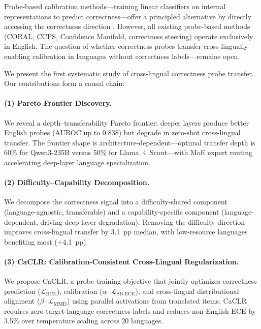\documentclass[11pt,a4paper]{article}
\begin{document}
Probe-based calibration methods---training linear classifiers on internal representations to predict correctness---offer a principled alternative by directly accessing the correctness direction \cite{}.
However, all existing probe-based methods (CORAL, CCPS, Confidence Manifold, correctness steering) operate exclusively in English.
The question of whether correctness probes transfer cross-lingually---enabling calibration in languages without correctness labels---remains open.

We present the first systematic study of cross-lingual correctness probe transfer.
Our contributions form a causal chain:

\paragraph{(1) Pareto Frontier Discovery.}
We reveal a depth--transferability Pareto frontier: deeper layers produce better English probes (AUROC up to 0.838) but degrade in zero-shot cross-lingual transfer.
The frontier shape is architecture-dependent---optimal transfer depth is 60\% for Qwen3-235B versus 50\% for Llama~4~Scout---with MoE expert routing accelerating deep-layer language specialization.

\paragraph{(2) Difficulty--Capability Decomposition.}
We decompose the correctness signal into a difficulty-shared component (language-agnostic, transferable) and a capability-specific component (language-dependent, driving deep-layer degradation).
Removing the difficulty direction improves cross-lingual transfer by 3.1~pp median, with low-resource languages benefiting most (+4.1~pp).

\paragraph{(3) CaCLR: Calibration-Consistent Cross-Lingual Regularization.}
We propose CaCLR, a probe training objective that jointly optimizes correctness prediction ($\mathcal{L}_\text{BCE}$), calibration ($\alpha \cdot \mathcal{L}_\text{SB-ECE}$), and cross-lingual distributional alignment ($\beta \cdot \mathcal{L}_\text{MMD}$) using parallel activations from translated items.
CaCLR requires zero target-language correctness labels and reduces non-English ECE by 3.5\% over temperature scaling across 20 languages.
\end{document}
